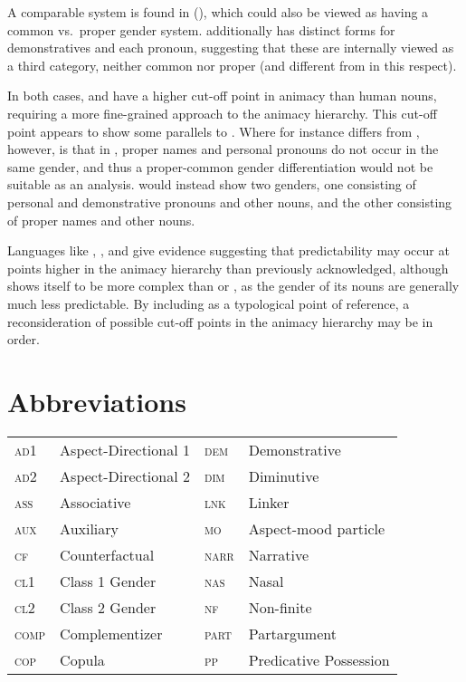 \documentclass[output=collectionpaper,hidelinks]{langscibook}
\theoremstyle{remark}
\begin{document}
A comparable system is found in  (), which could also be viewed as having a
common vs.\ proper gender system.   additionally has distinct forms for
demonstratives and each pronoun, suggesting that these are internally viewed as
a third category, neither common nor proper (and different from  in this
respect).

In both cases,  and  have a higher cut-off point in animacy than
human nouns, requiring a more fine-grained approach to the animacy hierarchy.
This cut-off point appears to show some parallels to .  Where  for
instance differs from , however, is that in , proper names and personal
pronouns do not occur in the same gender, and thus a proper-common gender
differentiation would not be suitable as an analysis.   would instead show
two genders, one consisting of personal and demonstrative pronouns and other
nouns, and the other consisting of proper names and other nouns.

Languages like , , and  give evidence suggesting that
predictability may occur at points higher in the animacy hierarchy than
previously acknowledged, although  shows itself to be more complex than
 or , as the gender of its nouns are generally much less
predictable. By including  as a typological point of reference, a
reconsideration of possible cut-off points in the animacy hierarchy may be in
order.

\section*{Abbreviations}
\begin{tabularx}{\textwidth}{lXlX}
  \textsc{ad1} 	&	 Aspect-Directional 1 	&	\textsc{dem} 	&	 Demonstrative 	\\
  \textsc{ad2} 	&	 Aspect-Directional 2 	&	\textsc{dim} 	&	 Diminutive 	\\
  \textsc{ass} 	&	 Associative 	&	\textsc{lnk} 	&	 Linker 	\\
  \textsc{aux} 	&	 Auxiliary 	&	\textsc{mo} 	&	 Aspect-mood particle 	\\
  \textsc{cf} 	&	 Counterfactual 	&	\textsc{narr} 	&	 Narrative 	\\
  \textsc{cl1} 	&	 Class 1 Gender 	&	\textsc{nas} 	&	 Nasal 	\\
  \textsc{cl2} 	&	 Class 2 Gender 	&	\textsc{nf} 	&	 Non-finite 	\\
  \textsc{comp} 	&	 Complementizer 	&	\textsc{part} 	&	 Partargument 	\\
  \textsc{cop} 	&	 Copula 	&	\textsc{pp} 	&	 Predicative Possession 	\\
\end{tabularx}
\end{document}
